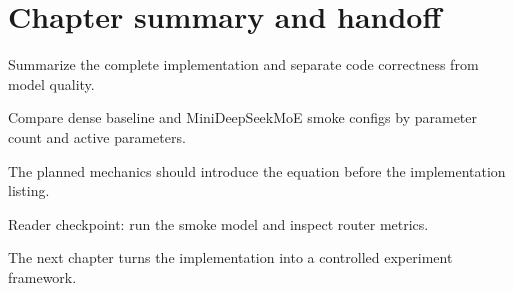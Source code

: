\section{Chapter summary and handoff}
\label{sec:ch10-chapter-summary-and-handoff}

Summarize the complete implementation and separate code correctness from model quality.



Compare dense baseline and MiniDeepSeekMoE smoke configs by parameter count and active parameters.



The planned mechanics should introduce the equation before the implementation listing.





\begin{checkpointbox}
Reader checkpoint: run the smoke model and inspect router metrics.
\end{checkpointbox}

The next chapter turns the implementation into a controlled experiment framework.
